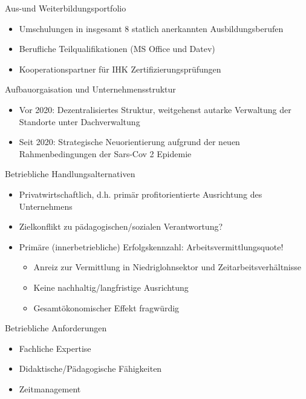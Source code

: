 \documentclass[
  10pt,
  ignorenonframetext,
]{beamer}
\providecommand{\tightlist}{%
  \setlength{\itemsep}{0pt}\setlength{\parskip}{0pt}}
\begin{document}
\begin{frame}{Aus-und Weiterbildungsportfolio}
\protect\hypertarget{aus-und-weiterbildungsportfolio}{}
\begin{itemize}
\tightlist
\item
  Umschulungen in insgesamt 8 statlich anerkannten Ausbildungsberufen
\item
  Berufliche Teilqualifikationen (MS Office und Datev)
\item
  Kooperationspartner für IHK Zertifizierungsprüfungen
\end{itemize}
\end{frame}

\begin{frame}{Aufbauorgaisation und Unternehmensstruktur}
\protect\hypertarget{aufbauorgaisation-und-unternehmensstruktur}{}
\begin{itemize}
\tightlist
\item
  Vor 2020: Dezentralisiertes Struktur, weitgehenst autarke Verwaltung
  der Standorte unter Dachverwaltung
\item
  Seit 2020: Strategische Neuorientierung aufgrund der neuen
  Rahmenbedingungen der Sars-Cov 2 Epidemie
\end{itemize}
\end{frame}

\begin{frame}{Betriebliche Handlungsalternativen}
\protect\hypertarget{betriebliche-handlungsalternativen}{}
\begin{itemize}
\tightlist
\item
  Privatwirtschaftlich, d.h. primär profitorientierte Ausrichtung des
  Unternehmens
\item
  Zielkonflikt zu pädagogischen/sozialen Verantwortung?
\item
  Primäre (innerbetriebliche) Erfolgskennzahl: Arbeitsvermittlungsquote!

  \begin{itemize}
  \tightlist
  \item
    Anreiz zur Vermittlung in Niedriglohnsektor und
    Zeitarbeitsverhältnisse
  \item
    Keine nachhaltig/langfristige Ausrichtung
  \item
    Gesamtökonomischer Effekt fragwürdig
  \end{itemize}
\end{itemize}
\end{frame}

\begin{frame}{Betriebliche Anforderungen}
\protect\hypertarget{betriebliche-anforderungen}{}
\begin{itemize}
\tightlist
\item
  Fachliche Expertise
\item
  Didaktische/Pädagogische Fähigkeiten
\item
  Zeitmanagement
\end{itemize}
\end{frame}
\end{document}
